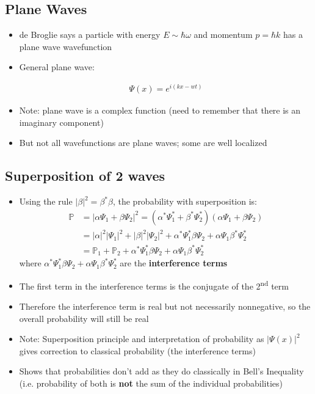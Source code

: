 \documentclass[a4paper,12pt]{article}
\begin{document}
\subsection{Plane Waves}
\begin{itemize}
  \item de Broglie says a particle with energy $E \sim \hbar \omega$ and momentum $p = \hbar k$ has a plane wave wavefunction
  \item General plane wave:

  \begin{align}
    \Psi(x) = e^{i(kx-wt)}
  \end{align}
  \item Note: plane wave is a complex function (need to remember that there is an imaginary component)
  \item But not all wavefunctions are plane waves; some are well localized
\end{itemize}

\subsection{Superposition of 2 waves}
\begin{itemize}
  \item Using the rule $|\beta|^2 = \beta^* \beta$, the probability with superposition is:
  \begin{align}
    \mathbb{P} &= |\alpha\Psi_1 + \beta\Psi_2|^2 = (\alpha^*\Psi_1^* + \beta^*\Psi_2^*)(\alpha\Psi_1 + \beta\Psi_2) \\ &=|\alpha|^2|\Psi_1|^2 + |\beta|^2|\Psi_2|^2 + \alpha^*\Psi_1^* \beta\Psi_2 + \alpha\Psi_1 \beta^*\Psi_2^* \\
    &= \mathbb{P}_1 + \mathbb{P}_2 + \alpha^*\Psi_1^* \beta\Psi_2 + \alpha\Psi_1 \beta^*\Psi_2^*
  \end{align}
  where $\alpha^*\Psi_1^* \beta\Psi_2 + \alpha\Psi_1 \beta^*\Psi_2^*$ are the \textbf{interference terms}

  \item The first term in the interference terms is the conjugate of the 2\textsuperscript{nd} term
  \item Therefore the interference term is real but not necessarily nonnegative, so the overall probability will still be real
  \item Note: Superposition principle and interpretation of probability as $|\Psi(x)|^2$ gives correction to classical probability (the interference terms)
  \item Shows that probabilities don't add as they do classically in Bell's Inequality (i.e. probability of both is \textbf{not} the sum of the individual probabilities)
\end{itemize}
\end{document}
